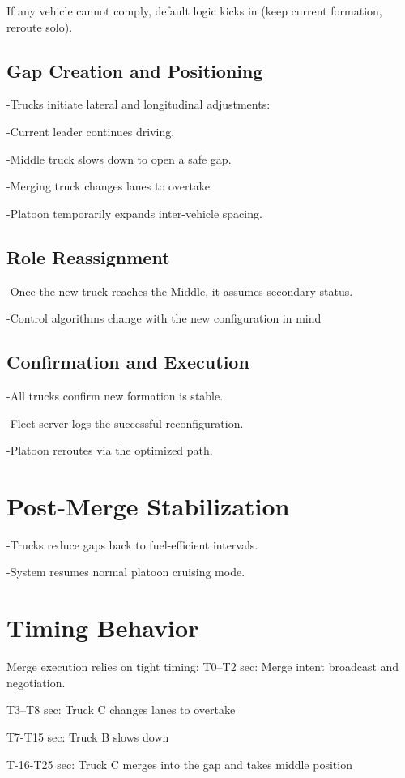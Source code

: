 \documentclass[english]{lni}
\begin{document}
If any vehicle cannot comply, default logic kicks in (keep current formation, reroute solo).


\subsection{Gap Creation and Positioning}
-Trucks initiate lateral and longitudinal adjustments:

-Current leader continues driving.

-Middle truck slows down to open a safe gap.

-Merging truck changes lanes to overtake

-Platoon temporarily expands inter-vehicle spacing.


\subsection{Role Reassignment}
-Once the new truck reaches the Middle, it assumes secondary status.

-Control algorithms change with the new configuration in mind


\subsection{Confirmation and Execution}
-All trucks confirm new formation is stable.

-Fleet server logs the successful reconfiguration.

-Platoon reroutes via the optimized path.


\section{Post-Merge Stabilization}
-Trucks reduce gaps back to fuel-efficient intervals.

-System resumes normal platoon cruising mode.

\section{Timing Behavior}

Merge execution relies on tight timing:
T0–T2 sec: Merge intent broadcast and negotiation.


T3–T8 sec: Truck C changes lanes to overtake


T7-T15 sec: Truck B slows down


T-16-T25 sec: Truck C merges into the gap and takes middle position
\end{document}
